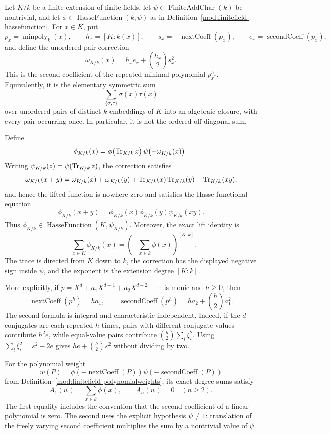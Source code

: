 \begin{theorem}\label{mod:finitefield-hassefunctionlift}
Let $K/k$ be a finite extension of finite fields, let
$\psi\in\operatorname{FiniteAddChar}(k)$ be nontrivial, and let
$\phi\in\operatorname{HasseFunction}(k,\psi)$ as in
Definition~\ref{mod:finitefield-hassefunction}.  For $x\in K$, put
\[
 p_x=\operatorname{minpoly}_k(x),\qquad
 h_x=[K:k(x)],\qquad
 s_x=-\operatorname{nextCoeff}(p_x),\qquad
 e_x=\operatorname{secondCoeff}(p_x),
\]
and define the unordered-pair correction
\[
 \omega_{K/k}(x)=h_xe_x+\binom{h_x}{2}s_x^2.
\]
This is the second coefficient of the repeated minimal polynomial
$p_x^{h_x}$.  Equivalently, it is the elementary symmetric sum
\[
 \sum_{\{\sigma,\tau\}}\sigma(x)\tau(x)
\]
over unordered pairs of distinct $k$-embeddings of $K$ into an
algebraic closure, with every pair occurring once.  In particular, it
is not the ordered off-diagonal sum.

Define
\[
 \phi_{K/k}(x)
 =\phi\!\left(\operatorname{Tr}_{K/k}x\right)
   \psi\!\left(-\omega_{K/k}(x)\right).
\]
Writing
\(\psi_{K/k}(z)=\psi(\operatorname{Tr}_{K/k}z)\), the correction satisfies
\[
 \omega_{K/k}(x+y)
 =\omega_{K/k}(x)+\omega_{K/k}(y)
   +\operatorname{Tr}_{K/k}(x)\operatorname{Tr}_{K/k}(y)-\operatorname{Tr}_{K/k}(xy),
\]
and hence the lifted function is nowhere zero and satisfies the Hasse
functional equation
\[
 \phi_{K/k}(x+y)
 =\phi_{K/k}(x)\phi_{K/k}(y)\psi_{K/k}(xy).
\]
Thus \(\phi_{K/k}\in\operatorname{HasseFunction}(K,\psi_{K/k})\).
Moreover, the exact lift identity is
\[
 \boxed{
 -\sum_{x\in K}\phi_{K/k}(x)
 =\left(-\sum_{x\in k}\phi(x)\right)^{[K:k]} .}
\]
The trace is directed from $K$ down to $k$, the correction has the
displayed negative sign inside $\psi$, and the exponent is the extension
degree $[K:k]$.

More explicitly, if $p=X^d+a_1X^{d-1}+a_2X^{d-2}+\cdots$ is monic and
$h\geq0$, then
\[
 \operatorname{nextCoeff}(p^h)=h a_1,
 \qquad
 \operatorname{secondCoeff}(p^h)
 =h a_2+\binom h2a_1^2.
\]
The second formula is integral and characteristic-independent.  Indeed,
if the $d$ conjugates are each repeated $h$ times, pairs with different
conjugate values contribute $h^2e$, while equal-value pairs contribute
$\binom h2\sum_i\xi_i^2$.  Using $\sum_i\xi_i^2=s^2-2e$ gives
$he+\binom h2s^2$ without dividing by two.

For the polynomial weight
\[
 w(P)=\phi\!\left(-\operatorname{nextCoeff}(P)\right)
       \psi\!\left(-\operatorname{secondCoeff}(P)\right)
\]
from Definition~\ref{mod:finitefield-polynomialweights}, its exact-degree
sums satisfy
\[
 A_1(w)=\sum_{x\in k}\phi(x),
 \qquad
 A_n(w)=0\quad(n\geq2).
\]
The first equality includes the convention that the second coefficient
of a linear polynomial is zero.  The second uses the explicit hypothesis
$\psi\ne1$: translation of the freely varying second coefficient
multiplies the sum by a nontrivial value of $\psi$.


\end{theorem}
